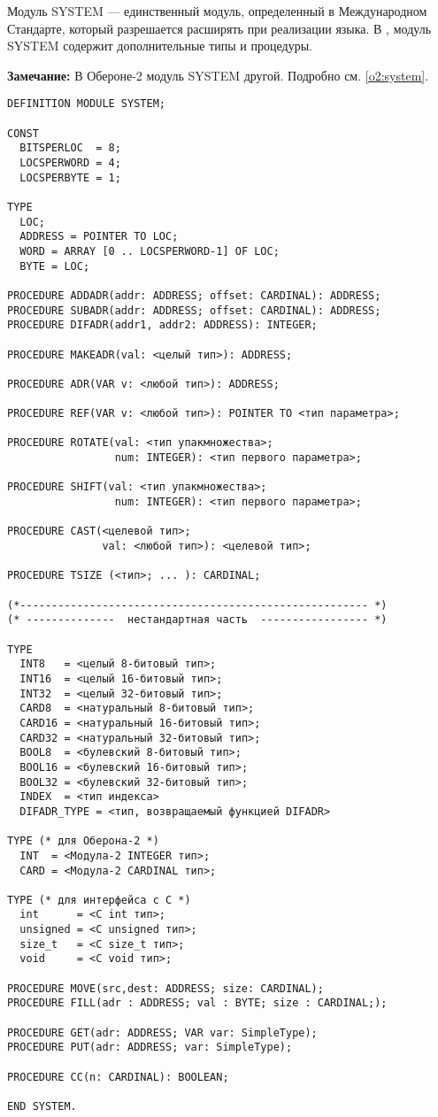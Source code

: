Модуль  SYSTEM  --- единственный модуль, определенный в
Международном Стандарте, который разрешается расширять при
реализации языка.
В \XDS{}, модуль SYSTEM содержит дополнительные 
типы и процедуры.

{\bf Замечание:} В Обероне-2 модуль SYSTEM другой.
Подробно см. \ref{o2:system}.

{\small
\begin{verbatim}
DEFINITION MODULE SYSTEM;

CONST
  BITSPERLOC  = 8;
  LOCSPERWORD = 4;
  LOCSPERBYTE = 1;

TYPE
  LOC;
  ADDRESS = POINTER TO LOC;
  WORD = ARRAY [0 .. LOCSPERWORD-1] OF LOC;
  BYTE = LOC;

PROCEDURE ADDADR(addr: ADDRESS; offset: CARDINAL): ADDRESS;
PROCEDURE SUBADR(addr: ADDRESS; offset: CARDINAL): ADDRESS;
PROCEDURE DIFADR(addr1, addr2: ADDRESS): INTEGER;

PROCEDURE MAKEADR(val: <целый тип>): ADDRESS;

PROCEDURE ADR(VAR v: <любой тип>): ADDRESS;

PROCEDURE REF(VAR v: <любой тип>): POINTER TO <тип параметра>;

PROCEDURE ROTATE(val: <тип упакмножества>;
                 num: INTEGER): <тип первого параметра>;

PROCEDURE SHIFT(val: <тип упакмножества>;
                 num: INTEGER): <тип первого параметра>;

PROCEDURE CAST(<целевой тип>;
               val: <любой тип>): <целевой тип>;

PROCEDURE TSIZE (<тип>; ... ): CARDINAL;

(*------------------------------------------------------- *)
(* --------------  нестандартная часть  ----------------- *)

TYPE
  INT8   = <целый 8-битовый тип>;
  INT16  = <целый 16-битовый тип>;
  INT32  = <целый 32-битовый тип>;
  CARD8  = <натуральный 8-битовый тип>;
  CARD16 = <натуральный 16-битовый тип>;
  CARD32 = <натуральный 32-битовый тип>;
  BOOL8  = <булевский 8-битовый тип>;
  BOOL16 = <булевский 16-битовый тип>;
  BOOL32 = <булевский 32-битовый тип>;
  INDEX  = <тип индекса>
  DIFADR_TYPE = <тип, возвращаемый функцией DIFADR>

TYPE (* для Оберона-2 *)
  INT  = <Модула-2 INTEGER тип>;
  CARD = <Модула-2 CARDINAL тип>;

TYPE (* для интерфейса с C *)
  int      = <C int тип>;
  unsigned = <C unsigned тип>;
  size_t   = <C size_t тип>;
  void     = <C void тип>;

PROCEDURE MOVE(src,dest: ADDRESS; size: CARDINAL);
PROCEDURE FILL(adr : ADDRESS; val : BYTE; size : CARDINAL;);

PROCEDURE GET(adr: ADDRESS; VAR var: SimpleType);
PROCEDURE PUT(adr: ADDRESS; var: SimpleType);

PROCEDURE CC(n: CARDINAL): BOOLEAN;

END SYSTEM.
\end{verbatim}
} %

